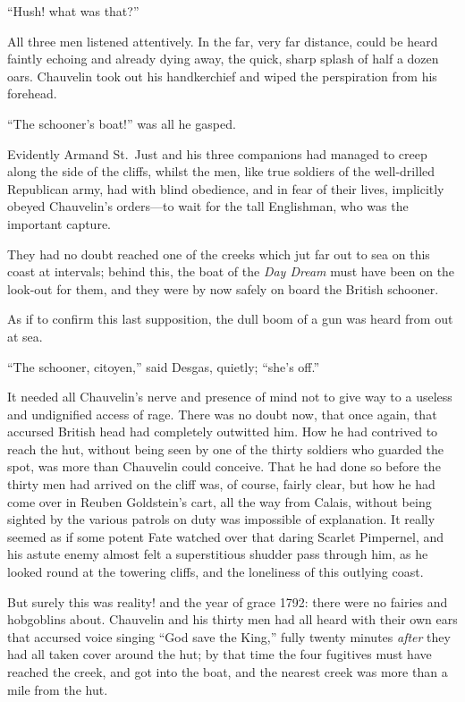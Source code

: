 \documentclass[paper=5.5in:8.5in,BCOR=7mm,twoside,DIV=calc,12pt,usegeometry,chapterprefix,endperiod,headings=big]{scrbook}
\begin{document}
\enquote{Hush! what was that?}

All three men listened attentively. In the far, very far distance, could be heard faintly echoing and already dying away, the quick, sharp splash of half a dozen oars. Chauvelin took out his handkerchief and wiped the perspiration from his forehead.

\enquote{The schooner's boat!} was all he gasped.

Evidently Armand St.~Just and his three companions had managed to creep along the side of the cliffs, whilst the men, like true soldiers of the well-drilled Republican army, had with blind obedience, and in fear of their lives, implicitly obeyed Chauvelin's orders---to wait for the tall Englishman, who was the important capture.

They had no doubt reached one of the creeks which jut far out to sea on this coast at intervals; behind this, the boat of the \textit{Day Dream} must have been on the look-out for them, and they were by now safely on board the British schooner.

As if to confirm this last supposition, the dull boom of a gun was heard from out at sea.

\enquote{The schooner, citoyen,} said Desgas, quietly; \enquote{she's off.}

It needed all Chauvelin's nerve and presence of mind not to give way to a useless and undignified access of rage. There was no doubt now, that once again, that accursed British head had completely outwitted him. How he had contrived to reach the hut, without being seen by one of the thirty soldiers who guarded the spot, was more than Chauvelin could conceive. That he had done so before the thirty men had arrived on the cliff was, of course, fairly clear, but how he had come over in Reuben Goldstein's cart, all the way from Calais, without being sighted by the various patrols on duty was impossible of explanation. It really seemed as if some potent Fate watched over that daring Scarlet Pimpernel, and his astute enemy almost felt a superstitious shudder pass through him, as he looked round at the towering cliffs, and the loneliness of this outlying coast.

But surely this was reality! and the year of grace 1792: there were no fairies and hobgoblins about. Chauvelin and his thirty men had all heard with their own ears that accursed voice singing \enquote{God save the King,} fully twenty minutes \textit{after} they had all taken cover around the hut; by that time the four fugitives must have reached the creek, and got into the boat, and the nearest creek was more than a mile from the hut.
\end{document}
